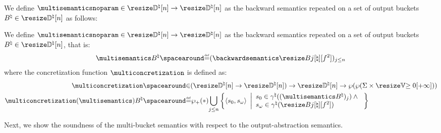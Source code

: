 We define
$\multisemanticsnoparam\in\multitype$ as the backward semantics repeated on a set of output buckets $\buckets\in\vectorbuckets$ as follows:

\begin{definition}
  We define
$\multisemanticsnoparam\in\multitype$ as the backward semantics repeated on a set of output buckets $\buckets\in\vectorbuckets$, that is:
\begin{align*}
\multisemantics\buckets \DefeQ (\backwardsemantics\bucket)_{j\le n}
\end{align*}
where the concretization function $\multiconcretization$ is defined as:
\begin{align*}
  \multiconcretization &\IN (\multitype)\to\vectorbuckets\to\outputvaluestype \\
  \multiconcretization(\multisemantics)\buckets &\DefeQ
  \nonemptysetof*{\bigsetjoin_{j\le n} \bigsetdef{\inputoutputtuple{\defstate}}{\retrieveinput{\defstate}\in\abstractdomainconcretization((\multisemantics\buckets)_j) \land{} \\ \retrieveoutput{\defstate}\in\abstractdomainconcretization(\bucket)}}
\end{align*}
\end{definition}

Next, we show the soundness of the multi-bucket semantics with respect to the output-abstraction semantics.

